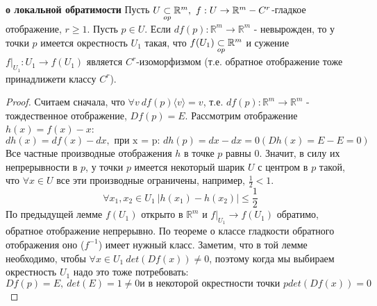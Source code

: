 \newpage
\begin{theorem}
    \textbf{о локальной обратимости}
    \newline
    Пусть $U \underset{op}{\subset} \mathbb{R}^m, \ f:U \to \mathbb{R}^m - C^r$-гладкое отображение, $r \geq 1$.
    Пусть $p \in U$. Если $df(p): \mathbb{R}^m \to \mathbb{R}^m$ - невырожден, то у точки $p$ имеется окрестность $U_1$ такая, что 
    $f(U_1) \underset{op}{\subset} \mathbb{R}^m$ и сужение $f|_{U_1}: U_1 \to f(U_1)$ является $C^r$-изоморфизмом (т.е. обратное отображение тоже принадлижети классу $C^r$).
    \begin{proof}
        Считаем сначала, что $\forall v \ df(p)\langle v \rangle = v$, т.е. $df(p):\mathbb{R}^m \to \mathbb{R}^m$ - тождественное отображение, $Df(p) = E$.
        Рассмотрим отображение $h(x) = f(x) - x$:
        \[dh(x) = df(x) - dx, \text{ при x = p: } dh(p) = dx - dx = 0 (Dh(x) = E - E = 0)\]
        Все частные производные отображения $h$ в точке $p$ равны 0. Значит, в силу их непрерывности в $p$,
        у точки $p$ имеется некоторый шарик $U$ с центром в $p$ такой, что $\forall x \in U$ все эти производные ограничены, например, $\frac{1}{2} < 1$.
        \[\forall x_1, x_2 \in U_1 \ \left|h(x_1) - h(x_2) \right| \leq \frac{1}{2} \]
        По предыдущей лемме $f(U_1)$ открыто в $\mathbb{R}^m$ и $f|_{U_1} \to f(U_1)$ обратимо, обратное отображение непрерывно.
        По теореме о классе гладкости обратного отображения оно ($f^{-1}$) имеет нужный класс. Заметим, что в той лемме необходимо, чтобы $\forall x \in U_1 \ det(Df(x)) \neq 0$, 
        поэтому когда мы выбираем окрестность $U_1$ надо это тоже потребовать:
        \[Df(p) = E, \ det(E) = 1 \neq 0 \text{и в некоторой окрестности  точки $p$} det(Df(x)) = 0\]
    \end{proof}
\end{theorem}

